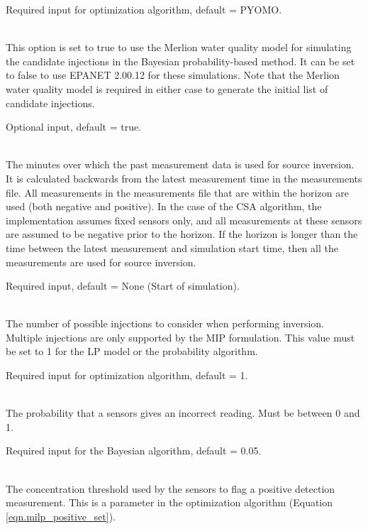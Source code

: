 \begin{description}[topsep=0pt,parsep=0.5em,itemsep=-0.4em]
\begin{description}[topsep=0pt,parsep=0.5em,itemsep=-0.4em]
                Required input for optimization algorithm, default = PYOMO.
    \item[{merlion water quality model}]\hfill
\\This option is set to true to use the Merlion 
                water quality model for simulating the candidate injections
                in the Bayesian probability-based method. It can be set to false
                to use EPANET 2.00.12 for these simulations. Note that the Merlion water quality
                model is required in either case to generate the initial list of candidate injections.
 
                Optional input, default = true.
    \item[{horizon}]\hfill
\\The minutes over which the past measurement
                data is used for source inversion. It is calculated backwards from
                the latest measurement time in the measurements file. 
                All measurements in the measurements file that are within the horizon 
                are used (both negative and positive). In the case of the CSA algorithm, 
                the implementation assumes fixed sensors only, and all measurements at 
                these sensors are assumed to be negative prior to the horizon.
                If the horizon is longer
                than the time between the latest measurement and simulation start time,
                then all the measurements are used for source inversion.
                
                Required input, default = None (Start of simulation).
    \item[{num injections}]\hfill
\\The number of possible injections to consider when
                performing inversion. Multiple injections are only supported by
                the MIP formulation. This value must be set to 1 for the LP model
                or the probability algorithm.
                
                Required input for optimization algorithm, default = 1.
    \item[{measurement failure}]\hfill
\\The probability that a sensors gives an incorrect reading. Must be between 0 and 1. 
                
                Required input for the Bayesian algorithm, default = 0.05.
    \item[{positive threshold}]\hfill
\\The concentration threshold used by the sensors to flag a positive 
                detection measurement. This is a parameter in the optimization algorithm (Equation \ref{eqn.milp_positive_set}).
                

\end{description}
\end{description}

